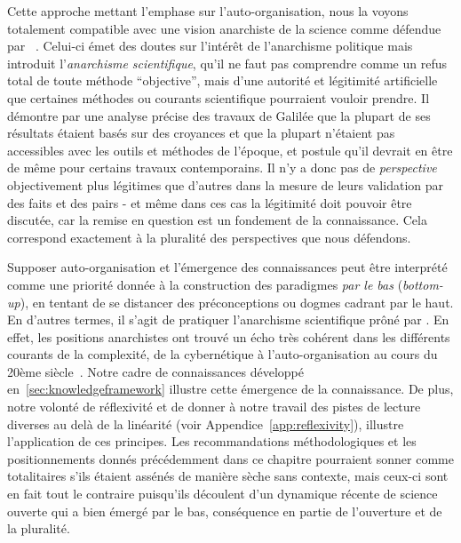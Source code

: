 Cette approche mettant l'emphase sur l'auto-organisation, nous la voyons totalement compatible avec une vision anarchiste de la science comme défendue par ~\cite{feyerabend1993against}. Celui-ci émet des doutes sur l'intérêt de l'anarchisme politique mais introduit l'\emph{anarchisme scientifique}, qu'il ne faut pas comprendre comme un refus total de toute méthode ``objective'', mais d'une autorité et légitimité artificielle que certaines méthodes ou courants scientifique pourraient vouloir prendre. Il démontre par une analyse précise des travaux de Galilée que la plupart de ses résultats étaient basés sur des croyances et que la plupart n'étaient pas accessibles avec les outils et méthodes de l'époque, et postule qu'il devrait en être de même pour certains travaux contemporains. Il n'y a donc pas de \emph{perspective} objectivement plus légitimes que d'autres dans la mesure de leurs validation par des faits et des pairs - et même dans ces cas la légitimité doit pouvoir être discutée, car la remise en question est un fondement de la connaissance. Cela correspond exactement à la pluralité des perspectives que nous défendons.


Supposer auto-organisation et l'émergence des connaissances peut être interprété comme une priorité donnée à la construction des paradigmes \emph{par le bas} (\emph{bottom-up}), en tentant de se distancer des préconceptions ou dogmes cadrant par le haut. En d'autres termes, il s'agit de pratiquer l'anarchisme scientifique prôné par . En effet, les positions anarchistes ont trouvé un écho très cohérent dans les différents courants de la complexité, de la cybernétique à l'auto-organisation au cours du 20ème siècle~\cite{duda2013cybernetics}. Notre cadre de connaissances développé en~\ref{sec:knowledgeframework} illustre cette émergence de la connaissance. De plus, notre volonté de réflexivité et de donner à notre travail des pistes de lecture diverses au delà de la linéarité (voir Appendice~\ref{app:reflexivity}), illustre l'application de ces principes. Les recommandations méthodologiques et les positionnements donnés précédemment dans ce chapitre pourraient sonner comme totalitaires s'ils étaient assénés de manière sèche sans contexte, mais ceux-ci sont en fait tout le contraire puisqu'ils découlent d'un dynamique récente de science ouverte qui a bien émergé par le bas, conséquence en partie de l'ouverture et de la pluralité.







